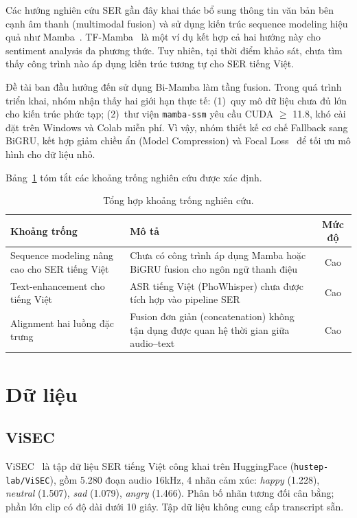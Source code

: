 \documentclass[runningheads]{llncs}
\begin{document}
Các hướng nghiên cứu SER gần đây khai thác bổ sung thông tin văn bản bên
cạnh âm thanh (multimodal fusion) và sử dụng kiến trúc sequence modeling
hiệu quả như Mamba~\cite{gu2023mamba}.
TF-Mamba~\cite{tfmamba2025} là một ví dụ kết hợp cả hai hướng này cho
sentiment analysis đa phương thức.
Tuy nhiên, tại thời điểm khảo sát, chưa tìm thấy công trình nào áp dụng
kiến trúc tương tự cho SER tiếng Việt.

Đề tài ban đầu hướng đến sử dụng Bi-Mamba làm tầng fusion. Trong quá trình
triển khai, nhóm nhận thấy hai giới hạn thực tế: (1)~quy mô dữ liệu chưa
đủ lớn cho kiến trúc phức tạp; (2)~thư viện \texttt{mamba-ssm} yêu cầu
CUDA $\geq$ 11.8, khó cài đặt trên Windows và Colab miễn phí.
Vì vậy, nhóm thiết kế cơ chế Fallback sang BiGRU, kết hợp giảm chiều ẩn
(Model Compression) và Focal Loss~\cite{lin2017focal} để tối ưu mô hình
cho dữ liệu nhỏ.

Bảng~\ref{tab:gap} tóm tắt các khoảng trống nghiên cứu được xác định.

\begin{table}[H]
\centering
\caption{Tổng hợp khoảng trống nghiên cứu.}
\label{tab:gap}
\begin{tabular}{@{}p{3.4cm}p{5.8cm}c@{}}
\toprule
\textbf{Khoảng trống} & \textbf{Mô tả} & \textbf{Mức độ} \\
\midrule
Sequence modeling nâng cao cho SER tiếng Việt
  & Chưa có công trình áp dụng Mamba hoặc BiGRU fusion cho ngôn ngữ thanh điệu & Cao \\[3pt]
Text-enhancement cho tiếng Việt
  & ASR tiếng Việt (PhoWhisper) chưa được tích hợp vào pipeline SER & Cao \\[3pt]
Alignment hai luồng đặc trưng
  & Fusion đơn giản (concatenation) không tận dụng được quan hệ thời gian giữa audio--text & Cao \\
\bottomrule
\end{tabular}
\end{table}

\section{Dữ liệu}
\label{sec:data}

\subsection{ViSEC}

ViSEC~\cite{visec2024} là tập dữ liệu SER tiếng Việt công khai trên
HuggingFace (\texttt{hustep-lab/ViSEC}), gồm 5.280 đoạn audio 16kHz,
4 nhãn cảm xúc: \textit{happy} (1.228), \textit{neutral} (1.507),
\textit{sad} (1.079), \textit{angry} (1.466).
Phân bố nhãn tương đối cân bằng; phần lớn clip có độ dài dưới 10 giây.
Tập dữ liệu không cung cấp transcript sẵn.
\end{document}
